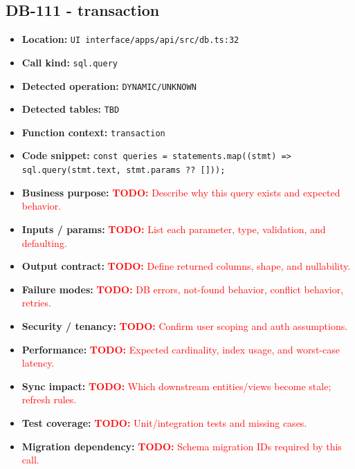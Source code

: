 \documentclass[11pt]{article}
\newcommand{\todoitem}[1]{\textcolor{red}{\textbf{TODO:} #1}}
\begin{document}
\subsection{DB-111 - transaction}
\begin{itemize}[leftmargin=1.5em]
\item \textbf{Location:} \texttt{UI interface/apps/api/src/db.ts:32}
\item \textbf{Call kind:} \texttt{sql.query}
\item \textbf{Detected operation:} \texttt{DYNAMIC/UNKNOWN}
\item \textbf{Detected tables:} \texttt{TBD}
\item \textbf{Function context:} \texttt{transaction}
\item \textbf{Code snippet:} \texttt{const queries = statements.map((stmt) => sql.query(stmt.text, stmt.params ?? []));}
\item \textbf{Business purpose:} \todoitem{Describe why this query exists and expected behavior.}
\item \textbf{Inputs / params:} \todoitem{List each parameter, type, validation, and defaulting.}
\item \textbf{Output contract:} \todoitem{Define returned columns, shape, and nullability.}
\item \textbf{Failure modes:} \todoitem{DB errors, not-found behavior, conflict behavior, retries.}
\item \textbf{Security / tenancy:} \todoitem{Confirm user scoping and auth assumptions.}
\item \textbf{Performance:} \todoitem{Expected cardinality, index usage, and worst-case latency.}
\item \textbf{Sync impact:} \todoitem{Which downstream entities/views become stale; refresh rules.}
\item \textbf{Test coverage:} \todoitem{Unit/integration tests and missing cases.}
\item \textbf{Migration dependency:} \todoitem{Schema migration IDs required by this call.}
\end{itemize}
\end{document}
